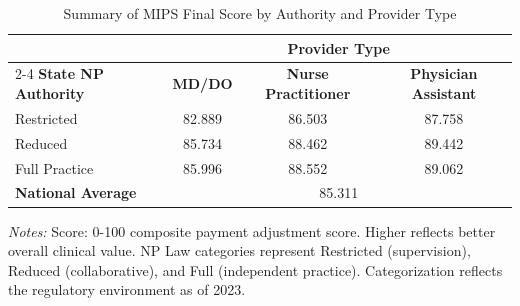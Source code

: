 \begin{table}[htbp]
    \centering
    \caption{Summary of MIPS Final Score by Authority and Provider Type}
    \label{tab:mips_final_score_provtype}
    \vspace{0.2cm}
    \begin{tabular}{lccc}
        \toprule
        & \multicolumn{3}{c}{\textbf{Provider Type}} \\
        \cmidrule(lr){2-4}
        \textbf{State NP Authority} & \textbf{MD/DO} & \textbf{Nurse Practitioner} & \textbf{Physician Assistant} \\
        \midrule
        Restricted & 82.889 & 86.503 & 87.758 \\
        Reduced & 85.734 & 88.462 & 89.442 \\
        Full Practice & 85.996 & 88.552 & 89.062 \\
        \midrule
        \textbf{National Average} & \multicolumn{3}{c}{85.311} \\
        \bottomrule
    \end{tabular}
    \vspace{0.1cm}
    \begin{minipage}{0.85\textwidth}
        \footnotesize \textit{Notes:} Score: 0-100 composite payment adjustment score. Higher reflects better overall clinical value. NP Law categories represent Restricted (supervision), Reduced (collaborative), and Full (independent practice). Categorization reflects the regulatory environment as of 2023.
    \end{minipage}
\end{table}